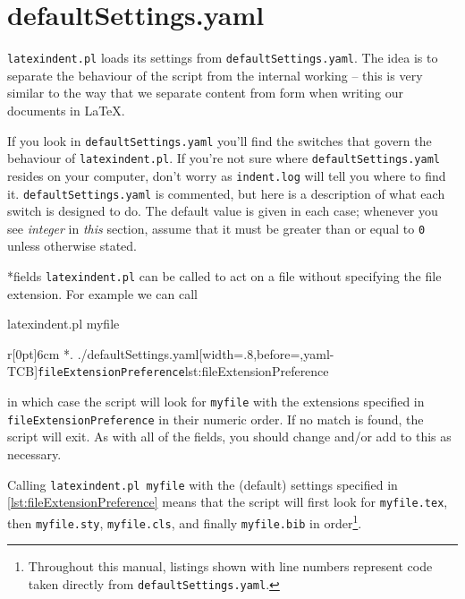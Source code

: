 \section{defaultSettings.yaml}
 \label{sec:defuseloc}
 \texttt{latexindent.pl} loads its settings from \texttt{defaultSettings.yaml}.
 The idea is to separate the behaviour of the script from the internal working -- this is very similar to the way that we separate content from form when writing our documents in \LaTeX.

 If you look in \texttt{defaultSettings.yaml} you'll find the switches that govern the behaviour of \texttt{latexindent.pl}.
 If you're not sure where \texttt{defaultSettings.yaml} resides on your computer, don't worry as \texttt{indent.log} will tell you where to find it.
 \texttt{defaultSettings.yaml} is commented, but here is a description of what each switch is designed to do.
 The default value is given in each case; whenever you see \emph{integer} in \emph{this} section, assume that it must be greater than or equal to \texttt{0} unless otherwise stated.

*{fields}
	\texttt{latexindent.pl} can be called to act on a file without specifying the file extension.
	For example we can call \begin{commandshell}
latexindent.pl myfile
\end{commandshell} \begin{wrapfigure}[8]{r}[0pt]{6cm} \cmhlistingsfromfile[style=fileExtensionPreference]*{.
		./defaultSettings.yaml}[width=.8\linewidth,before=\centering,yaml-TCB]{\texttt{fileExtensionPreference}}{lst:fileExtensionPreference}
	\end{wrapfigure}

	in which case the script will look for \texttt{myfile} with the extensions
	specified in \texttt{fileExtensionPreference} in their numeric order.
	If no match is found, the script will exit.
	As with all of the fields, you should change and/or add to this as necessary.

	Calling \texttt{latexindent.pl myfile} with the (default) settings specified in \cref{lst:fileExtensionPreference} means that the script will first look for \texttt{myfile.tex}, then \texttt{myfile.sty}, \texttt{myfile.cls}, and finally \texttt{myfile.bib} in order\footnote{Throughout this manual, listings shown with line numbers represent code taken directly from \texttt{defaultSettings.yaml}.
	}.

